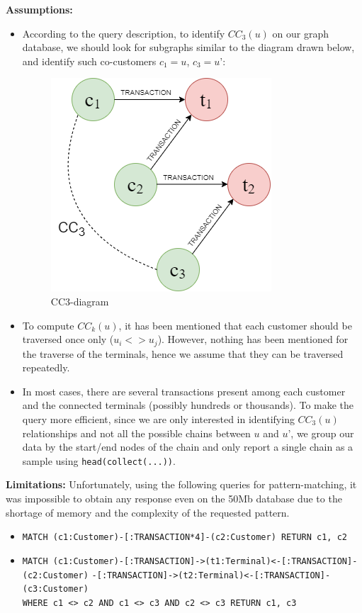\textbf{Assumptions:}

\begin{itemize}
\item
  According to the query description, to identify \(CC_3(u)\) on our
  graph database, we should look for subgraphs similar to the diagram
  drawn below, and identify such co-customers \(c_1=u\), \(c_3=u’\):

  \begin{figure}
  \centering
  \includegraphics{images/CC3-diagram.png}
  \caption{CC3-diagram}
  \end{figure}
\item
  To compute \(CC_k(u)\), it has been mentioned that each customer
  should be traversed once only (\(u_i<>u_j\)). However, nothing has
  been mentioned for the traverse of the terminals, hence we assume that
  they can be traversed repeatedly.
\item
  In most cases, there are several transactions present among each
  customer and the connected terminals (possibly hundreds or thousands).
  To make the query more efficient, since we are only interested in
  identifying \(CC_3(u)\) relationships and not all the possible chains
  between \(u\) and \(u’\), we group our data by the start/end nodes of
  the chain and only report a single chain as a sample using
  \texttt{head(collect(...))}.
\end{itemize}

\textbf{Limitations:} Unfortunately, using the following queries for
pattern-matching, it was impossible to obtain any response even on the
50Mb database due to the shortage of memory and the complexity of the
requested pattern.

\begin{itemize}
\tightlist
\item
  \texttt{MATCH\ (c1:Customer)-{[}:TRANSACTION*4{]}-(c2:Customer)\ RETURN\ c1,\ c2}
\item
  \texttt{MATCH\ (c1:Customer)-{[}:TRANSACTION{]}-\textgreater{}(t1:Terminal)\textless{}-{[}:TRANSACTION{]}-(c2:Customer)}
  \texttt{-{[}:TRANSACTION{]}-\textgreater{}(t2:Terminal)\textless{}-{[}:TRANSACTION{]}-(c3:Customer)}
  \texttt{WHERE\ c1\ \textless{}\textgreater{}\ c2\ AND\ c1\ \textless{}\textgreater{}\ c3\ AND\ c2\ \textless{}\textgreater{}\ c3\ RETURN\ c1,\ c3}
\end{itemize}


